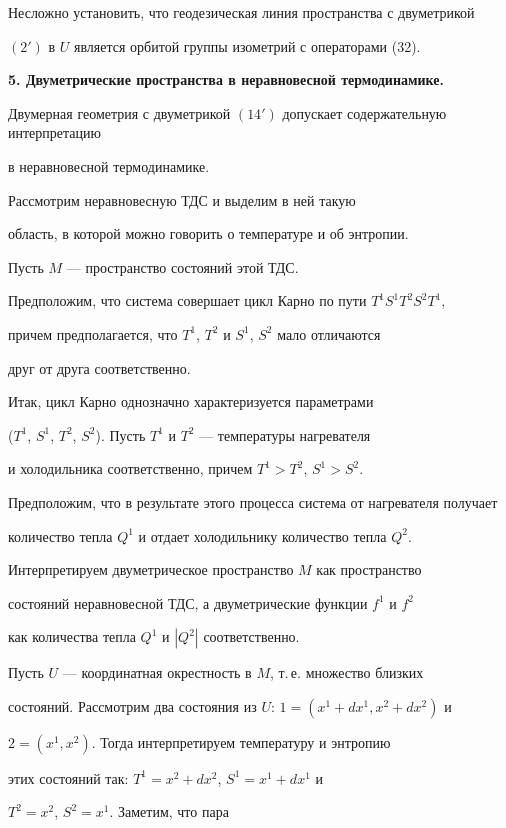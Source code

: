 Несложно установить, что геодезическая линия пространства с двуметрикой


$(2')$ в $U$ является орбитой группы изометрий с операторами (32).


\medskip








{\bf 5. Двуметрические пространства в неравновесной термодинамике.}


Двумерная геометрия с двуметрикой $(14')$ допускает содержательную интерпретацию


в неравновесной термодинамике.


Рассмотрим неравновесную ТДС и выделим в ней такую


область, в которой можно говорить о температуре и об энтропии.


Пусть $M$ --- пространство состояний этой ТДС.


Предположим, что система совершает цикл Карно по пути $T^1S^1T^2S^2T^1$,


причем предполагается, что $T^1$, $T^2$ и $S^1$, $S^2$ мало отличаются


друг от друга соответственно.


Итак, цикл Карно однозначно характеризуется параметрами


($T^1$, $S^1$, $T^2$, $S^2$). Пусть $T^1$ и $T^2$ --- температуры нагревателя


и холодильника соответственно, причем $T^1 > T^2$, $S^1>S^2$.


Предположим, что в результате этого процесса система от нагревателя получает


количество тепла $Q^1$ и отдает холодильнику количество тепла $Q^2$.


Интерпретируем двуметрическое пространство $M$ как пространство


состояний неравновесной ТДС, а двуметрические функции $f^1$ и $f^2$


как количества тепла $Q^1$ и $|Q^2|$ соответственно.


Пусть $U$ --- координатная окрестность в $M$, т.\,е. множество близких


состояний. Рассмотрим два состояния из $U$: $1=(x^1+dx^1,x^2+dx^2)$ и


$2=(x^1,x^2)$. Тогда интерпретируем температуру и энтропию


этих состояний так: $T^1=x^2+dx^2$, $S^1=x^1+dx^1$ и


$T^2=x^2$, $S^2=x^1$. Заметим, что пара


